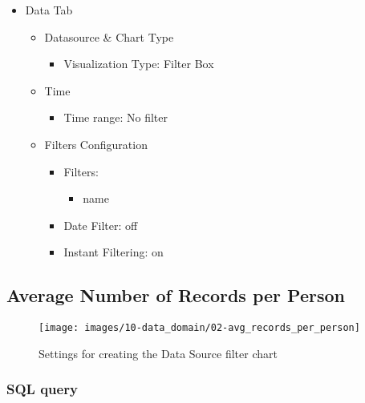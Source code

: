\documentclass[
]{book}
\providecommand{\tightlist}{%
  \setlength{\itemsep}{0pt}\setlength{\parskip}{0pt}}
\begin{document}
\begin{itemize}
\tightlist
\item
  Data Tab

  \begin{itemize}
  \tightlist
  \item
    Datasource \& Chart Type

    \begin{itemize}
    \tightlist
    \item
      Visualization Type: Filter Box
    \end{itemize}
  \item
    Time

    \begin{itemize}
    \tightlist
    \item
      Time range: No filter
    \end{itemize}
  \item
    Filters Configuration

    \begin{itemize}
    \tightlist
    \item
      Filters:

      \begin{itemize}
      \tightlist
      \item
        name
      \end{itemize}
    \item
      Date Filter: off
    \item
      Instant Filtering: on
    \end{itemize}
  \end{itemize}
\end{itemize}

\hypertarget{avgRecordsPerPerson}{%
\subsection*{Average Number of Records per Person}\label{avgRecordsPerPerson}}

\begin{figure}
\texttt{[image: images/10-data\_domain/02-avg\_records\_per\_person]} \caption{Settings for creating the Data Source filter chart}\label{fig:unnamed-chunk-1}
\end{figure}

\hypertarget{sql-query-26}{%
\subsubsection*{SQL query}\label{sql-query-26}}
\end{document}
